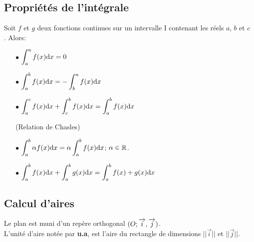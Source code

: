   \subsection*{Propriétés  de l'intégrale}
  \begin{property}
 Soit $f$  et $g$ deux fonctions continues sur un intervalle I contenant les réels  $a $, $b  $  et $c $. Alors:     
 \begin{itemize}
  \item[$  \bullet$]  $ \displaystyle\int_{a}^{a}f(x){\rm d}x =0$ 
  \item[$  \bullet$] $ \displaystyle\int_{a}^{b}f(x){\rm d}x = -\displaystyle\int_{b}^{a}f(x){\rm d}x$
  \item[$  \bullet$] $ \displaystyle\int_{a}^{c}f(x){\rm d}x +\displaystyle\int_{c}^{b}f(x){\rm d}x=\displaystyle\int_{a}^{b}f(x){\rm d}x$\;
  
  (Relation de Chasles)
\item[$  \bullet$]   $ \displaystyle\int_{a}^{b}\alpha f(x){\rm d}x =\alpha\displaystyle\int_{a}^{b}f(x){\rm d}x$;\; $\alpha\in\mathbb{R}$.
   \item[$  \bullet$] $ \displaystyle\int_{a}^{b}f(x){\rm d}x +\displaystyle\int_{a}^{b}g(x){\rm d}x=\displaystyle\int_{a}^{b}f(x)+g(x){\rm d}x$
 
\end{itemize}


 \end{property}
 

 
 \subsection{Calcul d'aires}

Le plan est muni d'un repère orthogonal  $ (O ;\overrightarrow{i},\overrightarrow{j}) $. \\ L'unité d'aire notée par \textbf{u.a},\;  est l'aire du rectangle de dimensions     $ ||\overrightarrow{i}|| $  et   $ ||\overrightarrow{j}|| $.



